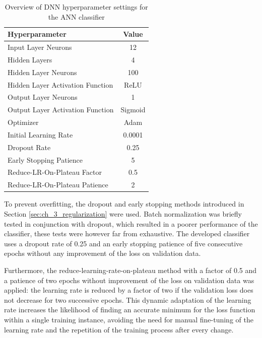 \begin{table}[h]
    \caption{Overview of DNN hyperparameter settings for the ANN classifier}
    \label{tab:ch_4_ann_topology}
    \begin{center}
        \begin{tabular}{lc}
            \hline
            Hyperparameter & Value\\
            \hline
            Input Layer Neurons & 12\\
            Hidden Layers & 4\\
            Hidden Layer Neurons & 100\\
            Hidden Layer Activation Function & ReLU\\
            Output Layer Neurons & 1\\
            Output Layer Activation Function & Sigmoid\\
            Optimizer & Adam\\
            Initial Learning Rate & 0.0001\\
            Dropout Rate & 0.25\\
            Early Stopping Patience & 5\\
            Reduce-LR-On-Plateau Factor & 0.5\\
            Reduce-LR-On-Plateau Patience & 2\\
            \hline
        \end{tabular}
    \end{center}
\end{table}

To prevent overfitting, the dropout and early stopping methods introduced in Section \ref{sec:ch_3_regularization} were used. Batch normalization was briefly tested in conjunction with dropout, which resulted in a poorer performance of the classifier, these tests were however far from exhaustive. The developed classifier uses a dropout rate of 0.25 and an early stopping patience of five consecutive epochs without any improvement of the loss on validation data.

Furthermore, the reduce-learning-rate-on-plateau method with a factor of 0.5 and a patience of two epochs without improvement of the loss on validation data was applied: the learning rate is reduced by a factor of two if the validation loss does not decrease for two successive epochs. This dynamic adaptation of the learning rate increases the likelihood of finding an accurate minimum for the loss function within a single training instance, avoiding the need for manual fine-tuning of the learning rate and the repetition of the training process after every change.

